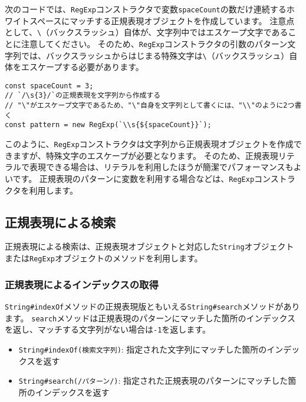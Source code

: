 次のコードでは、\texttt{RegExp}コンストラクタで変数\texttt{spaceCount}の数だけ連続するホワイトスペースにマッチする正規表現オブジェクトを作成しています。
注意点として、\texttt{\textbackslash}（バックスラッシュ）自体が、文字列中ではエスケープ文字であることに注意してください。
そのため、\texttt{RegExp}コンストラクタの引数のパターン文字列では、バックスラッシュからはじまる特殊文字は\texttt{\textbackslash}（バックスラッシュ）自体をエスケープする必要があります。

\begin{lstlisting}
const spaceCount = 3;
// `/\s{3}/`の正規表現を文字列から作成する
// "\"がエスケープ文字であるため、"\"自身を文字列として書くには、"\\"のように2つ書く
const pattern = new RegExp(`\\s{${spaceCount}}`);
\end{lstlisting}

このように、\texttt{RegExp}コンストラクタは文字列から正規表現オブジェクトを作成できますが、特殊文字のエスケープが必要となります。
そのため、正規表現リテラルで表現できる場合は、リテラルを利用したほうが簡潔でパフォーマンスもよいです。
正規表現のパターンに変数を利用する場合などは、\texttt{RegExp}コンストラクタを利用します。

\hypertarget{search-by-regexp}{%
\subsection{正規表現による検索}\label{search-by-regexp}}

正規表現による検索は、正規表現オブジェクトと対応した\texttt{String}オブジェクトまたは\texttt{RegExp}オブジェクトのメソッドを利用します。

\hypertarget{search-index-by-regexp}{%
\subsubsection{正規表現によるインデックスの取得}\label{search-index-by-regexp}}

\texttt{String\#indexOf}メソッドの正規表現版ともいえる\texttt{String\#search}メソッドがあります。
\texttt{search}メソッドは正規表現のパターンにマッチした箇所のインデックスを返し、マッチする文字列がない場合は\texttt{-1}を返します。

\begin{itemize}
\item
  \texttt{String\#indexOf(検索文字列)}:
  指定された文字列にマッチした箇所のインデックスを返す
\item
  \texttt{String\#search(/パターン/)}:
  指定された正規表現のパターンにマッチした箇所のインデックスを返す
\end{itemize}

